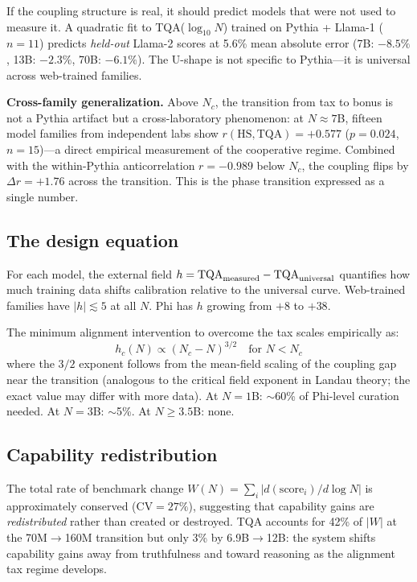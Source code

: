 \documentclass[11pt]{article}
\begin{document}
If the coupling structure is real, it should predict models that were not used to measure it.
A quadratic fit to TQA($\log_{10}N$) trained on Pythia + Llama-1 ($n=11$)
predicts \emph{held-out} Llama-2 scores at 5.6\% mean absolute error
(7B: $-8.5\%$, 13B: $-2.3\%$, 70B: $-6.1\%$).
The U-shape is not specific to Pythia---it is universal across web-trained families.

\textbf{Cross-family generalization.}
Above $N_c$, the transition from tax to bonus is not a Pythia artifact but a
cross-laboratory phenomenon: at $N \approx 7$B, fifteen model families from
independent labs show $r(\text{HS}, \text{TQA}) = +0.577$ ($p = 0.024$, $n = 15$)---a direct
empirical measurement of the cooperative regime.
Combined with the within-Pythia anticorrelation $r = -0.989$ below $N_c$, the
coupling flips by $\Delta r = +1.76$ across the transition.
This is the phase transition expressed as a single number.

\subsection{The design equation}

For each model, the external field $h = \mathrm{TQA}_{\rm measured} - \mathrm{TQA}_{\rm universal}$
quantifies how much training data shifts calibration relative to the universal curve.
Web-trained families have $|h| \lesssim 5$ at all $N$.
Phi has $h$ growing from $+8$ to $+38$.

The minimum alignment intervention to overcome the tax scales empirically as:
\begin{equation}
  h_c(N) \propto (N_c - N)^{3/2} \quad\text{for } N < N_c
  \label{eq:design}
\end{equation}
where the $3/2$ exponent follows from the mean-field scaling of
the coupling gap near the transition (analogous to the critical field
exponent in Landau theory; the exact value may differ with more data).
At $N = 1$B: $\sim$60\% of Phi-level curation needed.
At $N = 3$B: $\sim$5\%. At $N \geq 3.5$B: none.

\subsection{Capability redistribution}

The total rate of benchmark change
$W(N) = \sum_i |d(\text{score}_i)/d\log N|$ is approximately conserved
($\mathrm{CV} = 27\%$), suggesting that capability gains are \emph{redistributed}
rather than created or destroyed.
TQA accounts for 42\% of $|W|$ at the 70M$\to$160M transition but only 3\%
by 6.9B$\to$12B: the system shifts capability gains away from
truthfulness and toward reasoning as the alignment tax regime develops.
\end{document}
